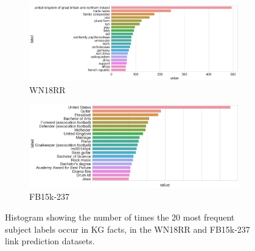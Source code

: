 
\begin{figure}
	\begin{subfigure}[b]{.5\linewidth}
   		\centering
    		\includegraphics[width=1.0\linewidth, height=0.7\linewidth]{WN18RR_Subject_Counts}
		\captionsetup{justification=centering}
		\caption{WN18RR}
	\end{subfigure}
	\begin{subfigure}[b]{.5\linewidth}
   		\centering
		\includegraphics[width=1.0\linewidth, height=0.7\linewidth]{FB15k-237_Subject_Counts}
		\captionsetup{justification=centering}
		\caption{FB15k-237}
	\end{subfigure}
	\captionsetup{justification=centering}
	\caption{Histogram showing the number of times the 20 most frequent subject labels occur in KG facts, in the WN18RR and FB15k-237 link prediction datasets.}
\end{figure}


